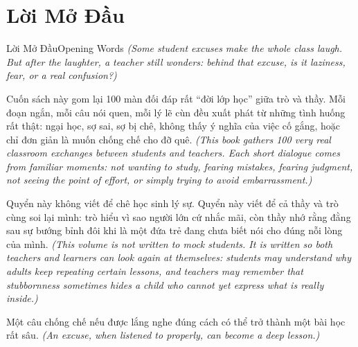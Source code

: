\chapter*{Lời Mở Đầu}

\begin{truyen}{Lời Mở Đầu}{Opening Words}
\textit{(Some student excuses make the whole class laugh. But after the laughter, a teacher still wonders: behind that excuse, is it laziness, fear, or a real confusion?) }

Cuốn sách này gom lại 100 màn đối đáp rất ``đời lớp học'' giữa trò và thầy. Mỗi đoạn ngắn, mỗi câu nói quen, mỗi lý lẽ cùn đều xuất phát từ những tình huống rất thật: ngại học, sợ sai, sợ bị chê, không thấy ý nghĩa của việc cố gắng, hoặc chỉ đơn giản là muốn chống chế cho đỡ quê.
\textit{(This book gathers 100 very real classroom exchanges between students and teachers. Each short dialogue comes from familiar moments: not wanting to study, fearing mistakes, fearing judgment, not seeing the point of effort, or simply trying to avoid embarrassment.)}

Quyển này không viết để chê học sinh lý sự. Quyển này viết để cả thầy và trò cùng soi lại mình: trò hiểu vì sao người lớn cứ nhắc mãi, còn thầy nhớ rằng đằng sau sự bướng bỉnh đôi khi là một đứa trẻ đang chưa biết nói cho đúng nỗi lòng của mình.
\textit{(This volume is not written to mock students. It is written so both teachers and learners can look again at themselves: students may understand why adults keep repeating certain lessons, and teachers may remember that stubbornness sometimes hides a child who cannot yet express what is really inside.)}
\end{truyen}

\begin{baihoc}
Một câu chống chế nếu được lắng nghe đúng cách có thể trở thành một bài học rất sâu.
\textit{(An excuse, when listened to properly, can become a deep lesson.)}
\end{baihoc}
\ngancach